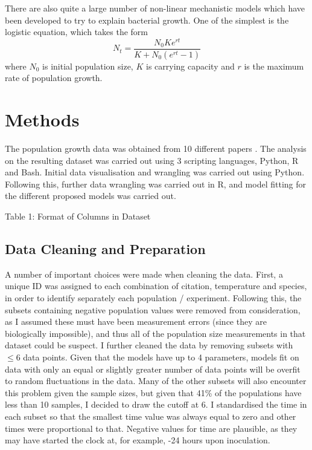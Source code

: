 \documentclass[11pt,a4wide,titlepage]{article}
\begin{document}
There are also quite a large number of non-linear mechanistic models which have been developed to try to explain bacterial growth. One of the simplest is the logistic equation, which takes the form
\[N_t = \frac{N_0Ke^{rt}}{K + N_0(e^{rt} - 1)}\]
where $N_0$ is initial population size, $K$ is carrying capacity and $r$ is the maximum rate of population growth.

\section*{Methods}
The population growth data was obtained from 10 different papers \citep{baeGrowthCharacteristicsBiofilm2014a,bernhardtMetabolicTheoryTemperatureSize2018,galarzPredictingBacterialGrowth2016,gillGrowthEscherichiaColi1991,phillipsRelationTemperatureGrowth1987,rothContinuityPsychrophilicMesophilic1962,silvaModellingGrowthLactic2018,sivonenEffectsLightTemperature1990,stannardTemperatureGrowthRelationships1985,zwieteringModelingBacterialGrowth1994}. The analysis on the resulting dataset was carried out using 3 scripting languages, Python, R and Bash. Initial data visualisation and wrangling was carried out using Python. Following this, further data wrangling was carried out in R, and model fitting for the different proposed models was carried out.\newline

\begin{center}
	Table 1: Format of Columns in Dataset \newline
	\newline
\end{center}

\subsection*{Data Cleaning and Preparation}
A number of important choices were made when cleaning the data. First, a unique ID was assigned to each combination of citation, temperature and species, in order to identify separately each population / experiment. Following this, the subsets containing negative population values were removed from consideration, as I assumed these must have been measurement errors (since they are biologically impossible), and thus all of the population size measurements in that dataset could be suspect. I further cleaned the data by removing subsets with $\le 6$ data points. Given that the models have up to 4 parameters, models fit on data with only an equal or slightly greater number of data points will be overfit to random fluctuations in the data. Many of the other subsets will also encounter this problem given the sample sizes, but given that 41\% of the populations have less than 10 samples, I decided to draw the cutoff at 6. I standardised the time in each subset so that the smallest time value was always equal to zero and other times were proportional to that. Negative values for time are plausible, as they may have started the clock at, for example, -24 hours upon inoculation.
\end{document}
